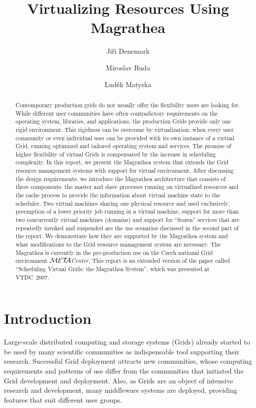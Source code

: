 \documentclass[a4paper]{article}
\title{Virtualizing \META{Center} Resources Using Magrathea}
\author{Ji\v{r}\'\i{} Denemark \and Miroslav Ruda \and Lud\v{e}k Matyska}
\def\META#1{\textit{${\cal MET\!\!A}$#1}}
\begin{document}
\maketitle

\begin{abstract}
Contemporary production grids do not usually offer the flexibility users are
looking for. While different user communities have often contradictory
requirements on the operating system, libraries, and applications, the
production Grids provide only one rigid environment. This rigidness can be
overcome by virtualization, when every user community or even individual user
can be provided with its own instance of a virtual Grid, running optimized and
tailored operating system and services. The promise of higher flexibility of
virtual Grids is compensated by the increase in scheduling complexity. In this
report, we present the Magrathea system that extends the Grid resource
management systems with support for virtual environment. After discussing the
design requirements, we introduce the Magrathea architecture that consists of
three components: the master and slave processes running on virtualized
resources and the cache process to provide the information about virtual
machine state to the scheduler. Two virtual machines sharing one physical
resource and used exclusively, preemption of a lower priority job running in a
virtual machine, support for more than two concurrently virtual machines
(domains) and support for ``frozen'' services that are repeatedly invoked and
suspended are the use scenarios discussed in the second part of the report. We
demonstrate how they are supported by the Magrathea system and what
modifications to the Grid resource management system are necessary. The
Magrathea is currently in the pre-production use on the Czech national Grid
environment \META{Center}. This report is an extended version of the paper
called ``Scheduling Virtual Grids: the Magrathea System'', which was presented
at VTDC~2007.
\end{abstract}

\section{Introduction}

Large-scale distributed computing and storage systems (Grids) already started
to be used by many scientific communities as indispensable tool supporting
their research. Successful Grid deployment attracts new communities, whose
computing requirements and patterns of use differ from the communities that
initiated the Grid development and deployment. Also, as Grids are an object of
intensive research and development, many middleware systems are deployed,
providing features that suit different user groups. 
\end{document}
